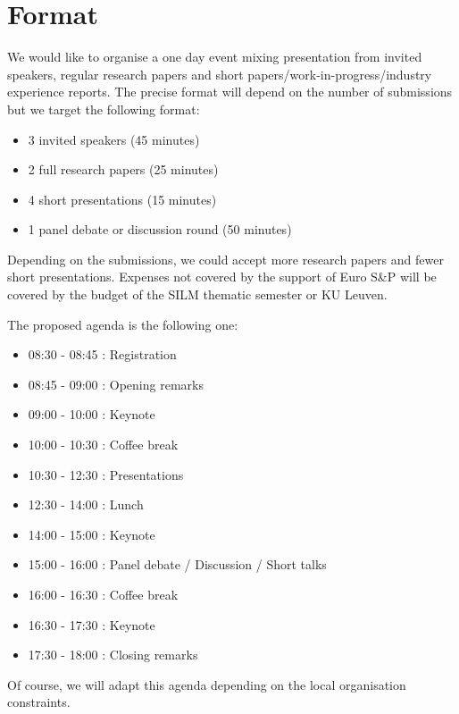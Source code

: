 \documentclass[a4paper,11pt]{article}
\begin{document}
\section{Format}
%
We would like to organise a one day event mixing presentation from invited
speakers, regular research papers and short
papers/work-in-progress/industry experience reports. The precise format
will depend on the number of submissions but we target the following
format:
%
\begin{itemize}
    \item 3 invited speakers (45 minutes)
    \item 2 full research papers (25 minutes)
    \item 4 short presentations (15 minutes)
    \item 1 panel debate or discussion round (50 minutes)
\end{itemize}

Depending on the submissions, we could accept more research papers and
fewer short presentations. Expenses not covered by the support of Euro S\&P
will be covered by the budget of the SILM thematic semester or KU Leuven.

The proposed agenda is the following one:
%
\begin{itemize}
    \item 08:30 - 08:45 : Registration
    \item 08:45 - 09:00 : Opening remarks
    \item 09:00 - 10:00 : Keynote
    \item 10:00 - 10:30 : Coffee break
    \item 10:30 - 12:30 : Presentations
    \item 12:30 - 14:00 : Lunch
    \item 14:00 - 15:00 : Keynote
    \item 15:00 - 16:00 : Panel debate / Discussion / Short talks
    \item 16:00 - 16:30 : Coffee break
    \item 16:30 - 17:30 : Keynote
    \item 17:30 - 18:00 : Closing remarks
\end{itemize}
%
Of course, we will adapt this agenda depending on the local organisation constraints.


\end{document}
